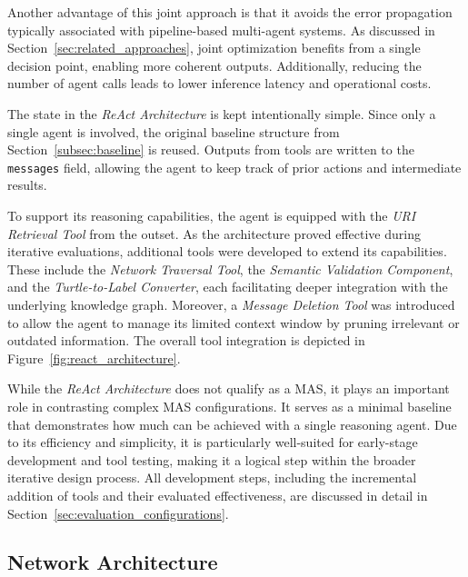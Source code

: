 \documentclass[a4paper,oneside,bibliography=totoc]{scrbook}
\begin{document}
Another advantage of this joint approach is that it avoids the error propagation typically associated with pipeline-based multi-agent systems. As discussed in Section~\ref{sec:related_approaches}, joint optimization benefits from a single decision point, enabling more coherent outputs. Additionally, reducing the number of agent calls leads to lower inference latency and operational costs.

The state in the \textit{ReAct Architecture} is kept intentionally simple. Since only a single agent is involved, the original baseline structure from Section~\ref{subsec:baseline} is reused. Outputs from tools are written to the \texttt{messages} field, allowing the agent to keep track of prior actions and intermediate results.

To support its reasoning capabilities, the agent is equipped with the \textit{URI Retrieval Tool} from the outset. As the architecture proved effective during iterative evaluations, additional tools were developed to extend its capabilities. These include the \textit{Network Traversal Tool}, the \textit{Semantic Validation Component}, and the \textit{Turtle-to-Label Converter}, each facilitating deeper integration with the underlying knowledge graph. Moreover, a \textit{Message Deletion Tool} was introduced to allow the agent to manage its limited context window by pruning irrelevant or outdated information. The overall tool integration is depicted in Figure~\ref{fig:react_architecture}.

While the \textit{ReAct Architecture} does not qualify as a \ac{MAS}, it plays an important role in contrasting complex \ac{MAS} configurations. It serves as a minimal baseline that demonstrates how much can be achieved with a single reasoning agent. Due to its efficiency and simplicity, it is particularly well-suited for early-stage development and tool testing, making it a logical step within the broader iterative design process. All development steps, including the incremental addition of tools and their evaluated effectiveness, are discussed in detail in Section~\ref{sec:evaluation_configurations}.

\subsection{Network Architecture}
\label{subsec:network}
\end{document}
